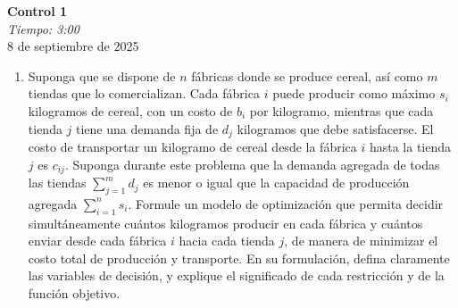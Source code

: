\documentclass{article}
\begin{document}


\begin{center}
    \Huge{\textbf{Control 1}}\\
\textit{\large{Tiempo: 3:00}}\\
    \normalsize
    8 de septiembre de 2025
\end{center}

\begin{enumerate}
	\item Suponga que se dispone de \(n\) fábricas donde se produce cereal, así como \(m\) tiendas que lo comercializan. Cada fábrica \(i\) puede producir como máximo \(s_i\) kilogramos de cereal, con un costo de \(b_i\) por kilogramo, mientras que cada tienda \(j\) tiene una demanda fija de \(d_j\) kilogramos que debe satisfacerse. El costo de transportar un kilogramo de cereal desde la fábrica \(i\) hasta la tienda \(j\) es \(c_{ij}\). Suponga durante este problema que la demanda agregada de todas las tiendas \(\sum_{j=1}^m d_j\) es menor o igual que la capacidad de producción agregada \(\sum_{i=1}^n s_i\). Formule un modelo de optimización que permita decidir simultáneamente cuántos kilogramos producir en cada fábrica y cuántos enviar desde cada fábrica \(i\) hacia cada tienda \(j\), de manera de minimizar el costo total de producción y transporte. En su formulación, defina claramente las variables de decisión, y explique el significado de cada restricción y de la función objetivo.


\end{enumerate}
\end{document}
